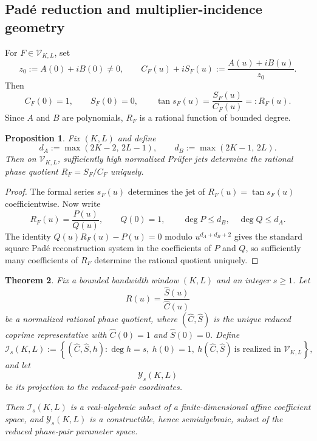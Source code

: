 \documentclass[11pt,reqno]{amsart}
\newtheorem{theorem}{Theorem}[section]
\newtheorem{proposition}[theorem]{Proposition}
\theoremstyle{definition}
\begin{document}
\subsection*{Pad\'e reduction and multiplier-incidence geometry}

For $F\in\mathcal V_{K,L}$, set
\[
z_0:=A(0)+iB(0)\neq 0,
\qquad
C_F(u)+iS_F(u):=\frac{A(u)+iB(u)}{z_0}.
\]
Then
\[
C_F(0)=1,
\qquad
S_F(0)=0,
\qquad
\tan s_F(u)=\frac{S_F(u)}{C_F(u)}=:R_F(u).
\]
Since $A$ and $B$ are polynomials, $R_F$ is a rational function of bounded degree.

\begin{proposition}\label{prop:pade-reconstruction}
Fix $(K,L)$ and define
\[
d_A:=\max(2K-2,\,2L-1),
\qquad
d_B:=\max(2K-1,\,2L).
\]
Then on $\mathcal V_{K,L}$, sufficiently high normalized Pr\"ufer jets determine the rational
phase quotient $R_F=S_F/C_F$ uniquely.
\end{proposition}

\begin{proof}
The formal series $s_F(u)$ determines the jet of $R_F(u)=\tan s_F(u)$ coefficientwise. Now
write
\[
R_F(u)=\frac{P(u)}{Q(u)},
\qquad
Q(0)=1,
\qquad
\deg P\le d_B,\quad \deg Q\le d_A.
\]
The identity $Q(u)R_F(u)-P(u)=0$ modulo $u^{d_A+d_B+2}$ gives the standard square Pad\'e
reconstruction system in the coefficients of $P$ and $Q$, so sufficiently many coefficients of
$R_F$ determine the rational quotient uniquely.
\end{proof}

\begin{theorem}\label{thm:incidence-geometry}
Fix a bounded bandwidth window $(K,L)$ and an integer $s\ge 1$. Let
\[
R(u)=\frac{\widehat S(u)}{\widehat C(u)}
\]
be a normalized rational phase quotient, where $(\widehat C,\widehat S)$ is the unique reduced
coprime representative with $\widehat C(0)=1$ and $\widehat S(0)=0$. Define
\[
\mathcal I_s(K,L)
:=
\left\{
(\widehat C,\widehat S,h):
\deg h=s,\ h(0)=1,\ h(\widehat C,\widehat S)\ \text{is realized in }\mathcal V_{K,L}
\right\},
\]
and let
\[
\mathcal Y_s(K,L)
\]
be its projection to the reduced-pair coordinates.

Then $\mathcal I_s(K,L)$ is a real-algebraic subset of a finite-dimensional affine coefficient
space, and $\mathcal Y_s(K,L)$ is a constructible, hence semialgebraic, subset of the reduced
phase-pair parameter space.
\end{theorem}
\end{document}
